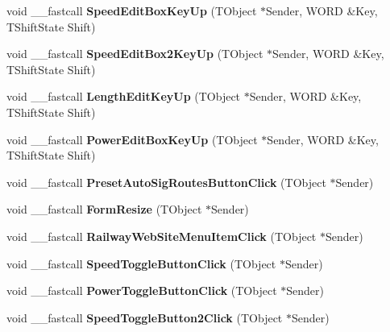 \begin{DoxyCompactItemize}
void \+\_\+\+\_\+fastcall {\bfseries Speed\+Edit\+Box\+Key\+Up} (T\+Object $\ast$Sender, W\+O\+RD \&Key, T\+Shift\+State Shift)
\item 
\mbox{\label{class_t_interface_ac9ade69d56c48a2bd209a3cad7027c2f}} 
void \+\_\+\+\_\+fastcall {\bfseries Speed\+Edit\+Box2\+Key\+Up} (T\+Object $\ast$Sender, W\+O\+RD \&Key, T\+Shift\+State Shift)
\item 
\mbox{\label{class_t_interface_a53206fd4d6f35c1f1981f018cf3a53df}} 
void \+\_\+\+\_\+fastcall {\bfseries Length\+Edit\+Key\+Up} (T\+Object $\ast$Sender, W\+O\+RD \&Key, T\+Shift\+State Shift)
\item 
\mbox{\label{class_t_interface_acbfd29973dae21817bad616910541ce8}} 
void \+\_\+\+\_\+fastcall {\bfseries Power\+Edit\+Box\+Key\+Up} (T\+Object $\ast$Sender, W\+O\+RD \&Key, T\+Shift\+State Shift)
\item 
\mbox{\label{class_t_interface_aa639148521a793641e694b15486b5055}} 
void \+\_\+\+\_\+fastcall {\bfseries Preset\+Auto\+Sig\+Routes\+Button\+Click} (T\+Object $\ast$Sender)
\item 
\mbox{\label{class_t_interface_a3fe9878a003d343a06f09c8f421e5a3b}} 
void \+\_\+\+\_\+fastcall {\bfseries Form\+Resize} (T\+Object $\ast$Sender)
\item 
\mbox{\label{class_t_interface_a0b6810d510f09d97ed750ffa1f3644a3}} 
void \+\_\+\+\_\+fastcall {\bfseries Railway\+Web\+Site\+Menu\+Item\+Click} (T\+Object $\ast$Sender)
\item 
\mbox{\label{class_t_interface_a4e50b78dc418e107fdd8676f6894515e}} 
void \+\_\+\+\_\+fastcall {\bfseries Speed\+Toggle\+Button\+Click} (T\+Object $\ast$Sender)
\item 
\mbox{\label{class_t_interface_a06d08704dc1619eb2d212d43d2cd3bd9}} 
void \+\_\+\+\_\+fastcall {\bfseries Power\+Toggle\+Button\+Click} (T\+Object $\ast$Sender)
\item 
\mbox{\label{class_t_interface_a26a7001957d7d5a178320723e07e4fb3}} 
void \+\_\+\+\_\+fastcall {\bfseries Speed\+Toggle\+Button2\+Click} (T\+Object $\ast$Sender)

\end{DoxyCompactItemize}
